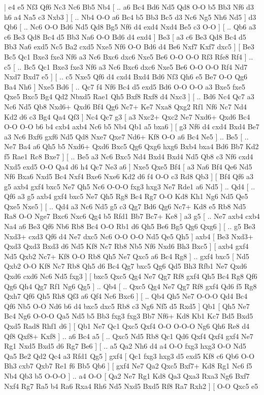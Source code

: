 \makegametitle 
|   e4   e5    Nf3   Qf6    Nc3   Nc6    Bb5   Nb4 [ .. a6  Bc4 Bd6  Nd5 Qd8  O-O b5  Bb3 Nf6  d3 h6  a4 Na5  c3 Nxb3   ]  [ .. Nb4  O-O a6  Bc4 b5  Bb3 Bc5  d3 Nc6  Ng5 Nh6  Nd5   ]  d3   Qb6 [ .. Nc6  O-O Bd6  Nd5 Qd8  Bg5 Nf6  d4 exd4  Nxd4 Be5  c3 O-O   ]  [ .. Qb6  a3 c6  Be3 Qd8  Bc4 d5  Bb3 Na6  O-O Bd6  d4 exd4   ]  Be3 [  a3 c6  Be3 Qd8  Bc4 d5  Bb3 Na6  exd5 Nc5  Ba2 cxd5  Nxe5 Nf6  O-O Bd6  d4 Be6  Nxf7 Kxf7  dxc5   ]  [  Be3 Bc5  Qc1 Bxe3  fxe3 Nf6  a3 Nc6  Bxc6 dxc6  Nxe5 Be6  O-O O-O  Rf3 Rfe8  Rf4   ] .. c5 [ .. Bc5  Qc1 Bxe3  fxe3 Nf6  a3 Nc6  Bxc6 dxc6  Nxe5 Be6  O-O O-O  Rf4 Nd7  Nxd7 Bxd7  e5   ]  [ .. c5  Nxe5 Qf6  d4 cxd4  Bxd4 Bd6  Nf3 Qh6  e5 Be7  O-O Qg6  Ba4 Nh6   ]  Nxe5   Bd6 [ .. Qc7  f4 Nf6  Bc4 d5  exd5 Bd6  O-O O-O  a3 Bxe5  fxe5 Qxe5  Bxc5 Bg4  Qd2 Nbxd5  Rae1 Qh5  Bxf8 Rxf8  d4 Nxc3   ]  [ .. Bd6  Nc4 Qc7  a3 Nc6  Nd5 Qb8  Nxd6+ Qxd6  Bf4 Qg6  Nc7+ Ke7  Nxa8 Qxg2  Rf1 Nf6  Nc7 Nd4  Kd2 d6  c3 Bg4  Qa4 Qf3   ]  Nc4   Qc7    g3 [  a3 Nxc2+  Qxc2 Ne7  Nxd6+ Qxd6  Bc4 O-O  O-O b6  b4 cxb4  axb4 Nc6  b5 Nb4  Qb1 a5  bxa6   ]  [  g3 Nf6  d4 cxd4  Bxd4 Be7  a3 Nc6  Bxf6 gxf6  Nd5 Qd8  Nxe7 Qxe7  Nd6+ Kf8  O-O a6  Bc4 Ne5   ] .. Be5 [ .. Ne7  Ba4 a6  Qh5 b5  Nxd6+ Qxd6  Bxc5 Qg6  Qxg6 hxg6  Bxb4 bxa4  Bd6 Bb7  Kd2 f5  Rae1 Rc8  Bxe7   ]  [ .. Be5  a3 Nc6  Bxc5 Nd4  Bxd4 Bxd4  Nd5 Qb8  c3 Nf6  cxd4 Nxd5  exd5 O-O  Qa4 d6  h4 Qc7  Ne3 a6   ]  Nxe5   Qxe5    Bf4 [  a3 Na6  Bf4 Qe6  Nd5 Nf6  Bxa6 Nxd5  Bc4 Nxf4  Bxe6 Nxe6  Kd2 d6  f4 O-O  c3 Rd8  Qb3   ]  [  Bf4 Qf6  a3 g5  axb4 gxf4  bxc5 Ne7  Qh5 Nc6  O-O-O fxg3  hxg3 Ne7  Rde1 a6  Nd5   ] .. Qd4 [ .. Qf6  a3 g5  axb4 gxf4  bxc5 Ne7  Qh5 Rg8  Bc4 Rg7  O-O Kd8  Kh1 Ng6  Nd5 Qe5  Qxe5 Nxe5   ]  [ .. Qd4  a3 Nc6  Nd5 g5  c3 Qg7  Bd6 Qg6  Nc7+ Kd8  e5 Rb8  Nd5 Ra8  O-O Nge7  Bxc6 Nxc6  Qg4 b5  Rfd1 Bb7  Bc7+ Ke8   ]  a3   g5 [ .. Ne7  axb4 cxb4  Na4 a6  Be3 Qf6  Nb6 Rb8  Bc4 O-O  Rb1 d6  Qh5 Be6  Bg5 Qg6  Qxg6   ]  [ .. g5  Be3 Nxd3+  cxd3 Qf6  d4 Ne7  dxc5 Nc6  O-O O-O  Nd5 Qe5  Qh5   ]  axb4 [  Be3 Nxd3+  Qxd3 Qxd3  Bxd3 d6  Nd5 Kf8  Nc7 Rb8  Nb5 Nf6  Nxd6 Bh3  Bxc5   ]  [  axb4 gxf4  Nd5 Qxb2  Nc7+ Kf8  O-O Rb8  Qh5 Ne7  Qxc5 a6  Bc4 Rg8   ] .. gxf4    bxc5 [  Nd5 Qxb2  O-O Kf8  Nc7 Rb8  Qh5 d6  Bc4 Qg7  bxc5 Qg6  Qd5 Bh3  Rfb1 Ne7  Qxd6 Qxd6  cxd6 Nc6  Nd5 fxg3   ]  [  bxc5 Qxc5  Qg4 Ne7  Qg7 Rf8  gxf4 Qh5  Bc4 Rg8  Qf6 Qg6  Qh4 Qg7  Rf1 Ng6  Qg5   ] .. Qb4 [ .. Qxc5  Qg4 Ne7  Qg7 Rf8  gxf4 Qd6  f5 Rg8  Qxh7 Qf6  Qh5 Rh8  Qf3 a6  Qf4 Nc6  Bxc6   ]  [ .. Qb4  Qh5 Ne7  O-O-O Qd4  Bc4 Qf6  Nb5 O-O  Nd6 b6  d4 bxc5  dxc5 Rb8  c3 Ng6  Nf5 d5  Rxd5   ]  Qb1 [  Qh5 Ne7  Bc4 Ng6  O-O-O Qa5  Nd5 b5  Bb3 fxg3  fxg3 Bb7  Nf6+ Kd8  Kb1 Kc7  Bd5 Bxd5  Qxd5 Rad8  Rhf1 d6   ]  [  Qb1 Ne7  Qc1 Qxc5  Qxf4 O-O  O-O-O Ng6  Qh6 Re8  d4 Qf8  Qxf8+ Kxf8   ] .. a6    Bc4   a5 [ .. Qxc5  Nd5 Rb8  Qc1 Qd6  Qxf4 Qxf4  gxf4 Ne7  Rg1 Nxd5  Bxd5 d6  Rg7 Be6   ]  [ .. a5  Qa2 Nh6  d4 a4  O-O fxg3  hxg3 O-O  Nd5 Qa5  Be2 Qd2  Qc4 a3  Rfd1 Qg5   ]  gxf4 [  Qc1 fxg3  hxg3 d5  exd5 Kf8  c6 Qb6  O-O Bh3  cxb7 Qxb7  Re1 f6  Bb5 Qb6   ]  [  gxf4 Ne7  Qa2 Qxc5  Bxf7+ Kd8  Rg1 Nc6  f5 Nb4  Qb3 b5  O-O-O   ] .. a4    O-O [  Qa2 Ne7  Rg1 Kd8  Qa3 Qxa3  Rxa3 Ng6  Bxf7 Nxf4  Rg7 Ra5  b4 Ra6  Rxa4 Rh6  Nd5 Nxd5  Bxd5 Rf8  Ra7 Rxh2   ]  [  O-O Qxc5  e5 